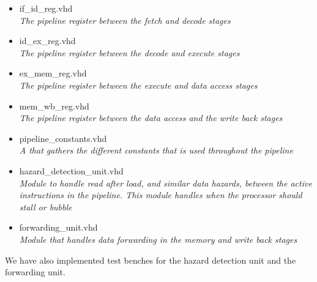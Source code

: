 \begin{itemize}
    \item if\_id\_reg.vhd \hfill \\
        \textit{The pipeline register between the fetch and decode stages}
    \item id\_ex\_reg.vhd \hfill \\
        \textit{The pipeline register between the decode and execute stages}
    \item ex\_mem\_reg.vhd \hfill \\
        \textit{The pipeline register between the execute and data access stages}
    \item mem\_wb\_reg.vhd \hfill \\
        \textit{The pipeline register between the data access and the write back stages}
    \item pipeline\_constants.vhd \hfill \\
        \textit{A that gathers the different constants that is used throughout the pipeline}
    \item hazard\_detection\_unit.vhd \hfill \\
        \textit{Module to handle read after load, and similar data hazards, between the 
        active instructions in the pipeline. This module handles when the processor should
        stall or bubble}
    \item forwarding\_unit.vhd \hfill \\
        \textit{Module that handles data forwarding in the memory and
        write back stages}
\end{itemize}
We have also implemented test benches for the hazard detection unit and the 
forwarding unit. 